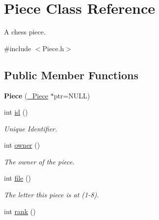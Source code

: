 \hypertarget{classPiece}{
\section{Piece Class Reference}
\label{classPiece}
}


A chess piece.  




{\ttfamily \#include $<$Piece.h$>$}

\subsection*{Public Member Functions}
\begin{DoxyCompactItemize}
\item 
\hypertarget{classPiece_ab172144e53910f4a3310ee11599965da}{
{\bfseries Piece} (\hyperlink{struct__Piece}{\_\-Piece} $\ast$ptr=NULL)}
\label{classPiece_ab172144e53910f4a3310ee11599965da}

\item 
\hypertarget{classPiece_a04789ec49b960e9d3443e59725fcf186}{
int \hyperlink{classPiece_a04789ec49b960e9d3443e59725fcf186}{id} ()}
\label{classPiece_a04789ec49b960e9d3443e59725fcf186}

\begin{DoxyCompactList}\small\item\em Unique Identifier. \item\end{DoxyCompactList}\item 
\hypertarget{classPiece_a9b34b0c38397e1e1cb10b833295731b7}{
int \hyperlink{classPiece_a9b34b0c38397e1e1cb10b833295731b7}{owner} ()}
\label{classPiece_a9b34b0c38397e1e1cb10b833295731b7}

\begin{DoxyCompactList}\small\item\em The owner of the piece. \item\end{DoxyCompactList}\item 
\hypertarget{classPiece_a0b8109f3dad5d577532f65dce6e44345}{
int \hyperlink{classPiece_a0b8109f3dad5d577532f65dce6e44345}{file} ()}
\label{classPiece_a0b8109f3dad5d577532f65dce6e44345}

\begin{DoxyCompactList}\small\item\em The letter this piece is at (1-\/8). \item\end{DoxyCompactList}\item 
\hypertarget{classPiece_a42669c948d916a0356a34020a2f94d34}{
int \hyperlink{classPiece_a42669c948d916a0356a34020a2f94d34}{rank} ()}
\label{classPiece_a42669c948d916a0356a34020a2f94d34}


\end{DoxyCompactItemize}
